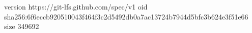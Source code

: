 version https://git-lfs.github.com/spec/v1
oid sha256:6f6eccb920510043f464f3c2d5492db0a7ac13724b7944d5bfc3b624e3f51e66
size 349692
